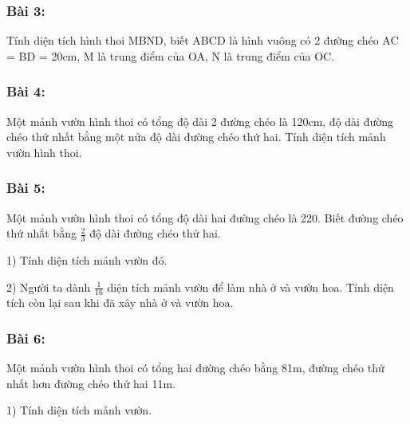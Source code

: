 \documentclass[11pt]{article}
\begin{document}
\subsubsection*{Bài 3:} Tính diện tích hình thoi MBND, biết ABCD là hình vuông có 2 đường chéo AC = BD = 20cm, M là trung điểm của OA, N là trung điểm của OC.

\begin{center}
\end{center}

\subsubsection*{Bài 4:} Một mảnh vườn hình thoi có tổng độ dài 2 đường chéo là 120cm, độ dài đường chéo thứ nhất bằng một nửa độ dài đường chéo thứ hai. Tính diện tích mảnh vườn hình thoi.

\subsubsection*{Bài 5:} Một mảnh vườn hình thoi có tổng độ dài hai đường chéo là 220. Biết đường chéo thứ nhất bằng $\frac{2}{3}$ độ dài đường chéo thứ hai.

1) Tính diện tích mảnh vườn đó.

2) Người ta dành $\frac{1}{16}$ diện tích mảnh vườn để làm nhà ở và vườn hoa. Tính diện tích còn lại sau khi đã xây nhà ở và vườn hoa.

\subsubsection*{Bài 6:} Một mảnh vườn hình thoi có tổng hai đường chéo bằng 81m, đường chéo thứ nhất hơn đường chéo thứ hai 11m.

1) Tính diện tích mảnh vườn.
\end{document}
